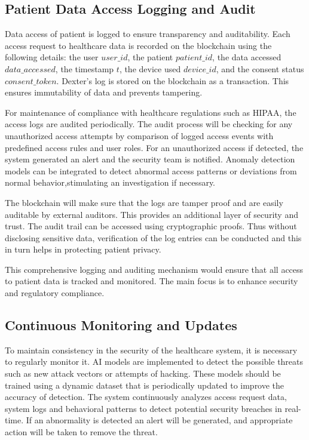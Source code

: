 \documentclass[pdflatex,sn-mathphys-num]{sn-jnl}
\theoremstyle{thmstyleone}%
\theoremstyle{thmstyletwo}%
\theoremstyle{thmstylethree}%
\begin{document}
\subsection{Patient Data Access Logging and Audit}
Data access of patient is logged to ensure transparency and auditability\cite{bib22}. Each access request to healthcare data is recorded on the blockchain using the following details: the user \( user\_id \), the patient \( patient\_id \), the data accessed \( data\_accessed \), the timestamp \( t \), the device used \( device\_id \), and the consent status \( consent\_token \). Dexter's log is stored on the blockchain as a transaction. This ensures immutability of data and prevents tampering.

For maintenance of compliance with healthcare regulations such as HIPAA, the access logs are audited periodically. The audit process will be checking for any unauthorized access attempts by comparison of logged access events with predefined access rules and user roles. For an unauthorized access if detected, the system generated an alert and the security team is notified. Anomaly detection models can be integrated to detect abnormal access patterns or deviations from normal behavior,stimulating an investigation if necessary.


The blockchain will make sure that the logs are tamper proof and are easily auditable by external auditors. This provides an additional layer of security and trust. The audit trail can be accessed using cryptographic proofs. Thus without disclosing sensitive data, verification of the log entries can be conducted and this in turn helps in protecting patient privacy.

This comprehensive logging and auditing mechanism would ensure that all access to patient data is tracked and monitored. The main focus is to enhance security and regulatory compliance.





\subsection{Continuous Monitoring and Updates}
To maintain consistency in the security of the healthcare system, it is necessary to regularly monitor it. AI models are implemented to detect the possible threats such as new attack vectors or attempts of hacking\cite{bib23}. These models should be trained using a dynamic dataset that is periodically updated to improve the accuracy of detection. The system continuously analyzes access request data, system logs and behavioral patterns to detect potential security breaches in real-time. If an abnormality is detected an alert will be generated, and appropriate action will be taken to remove the threat.
\end{document}
